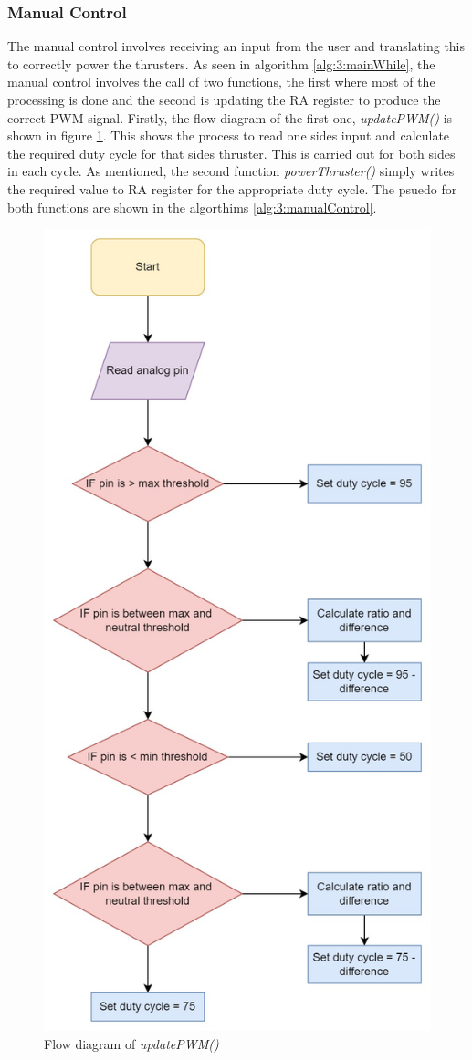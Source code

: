 	


\subsubsection{Manual Control}
The manual control involves receiving an input from the user and translating this to correctly power the thrusters. As seen in algorithm \ref{alg:3:mainWhile}, the manual control involves the call of two functions, the first where most of the processing is done and the second is updating the RA register to produce the correct PWM signal. Firstly, the flow diagram of the first one, \emph{updatePWM()} is shown in figure \ref{fig:3:updatePWM}. This shows the process to read one sides input and calculate the required duty cycle for that sides thruster. This is carried out for both sides in each cycle. As mentioned, the second function \emph{powerThruster()} simply writes the required value to RA register for the appropriate duty cycle. The psuedo for both functions are shown in the algorthims \ref{alg:3:manualControl}.
\begin{figure}
	\begin{center}
		\includegraphics[width = 0.55\linewidth]{figures/UpdatePWM.jpg}
		\caption{Flow diagram of \emph{updatePWM()}}
		\label{fig:3:updatePWM}
	\end{center}
\end{figure}

